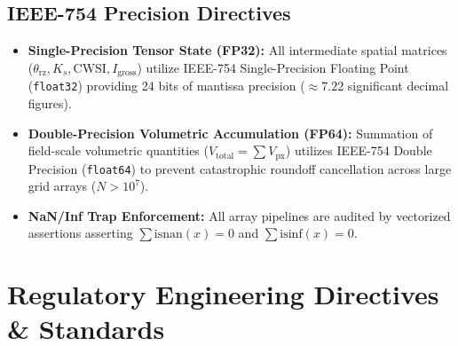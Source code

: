 \documentclass[11pt,a4paper]{article}
\theoremstyle{definition}
\theoremstyle{remark}
\begin{document}
\subsection{IEEE-754 Precision Directives}
\begin{itemize}
    \item \textbf{Single-Precision Tensor State (FP32):} All intermediate spatial matrices ($\theta_{\text{rz}}, K_s, \text{CWSI}, I_{\text{gross}}$) utilize IEEE-754 Single-Precision Floating Point (\texttt{float32}) providing 24 bits of mantissa precision ($\approx 7.22$ significant decimal figures).
    \item \textbf{Double-Precision Volumetric Accumulation (FP64):} Summation of field-scale volumetric quantities ($V_{\text{total}} = \sum V_{\text{px}}$) utilizes IEEE-754 Double Precision (\texttt{float64}) to prevent catastrophic roundoff cancellation across large grid arrays ($N > 10^7$).
    \item \textbf{NaN/Inf Trap Enforcement:} All array pipelines are audited by vectorized assertions asserting $\sum \text{isnan}(x) = 0$ and $\sum \text{isinf}(x) = 0$.
\end{itemize}


\section{Regulatory Engineering Directives \& Standards}
\end{document}
